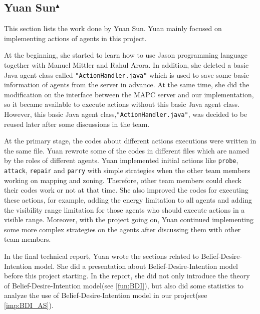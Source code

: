 \subsection[Yuan Sun]{Yuan Sun$^{\blacktriangle}$}
This section lists the work done by Yuan Sun.
Yuan mainly focused on implementing actions of agents in this project. 

At the beginning, she started to learn how to use Jason programming language together with Manuel Mittler and Rahul Arora. In addition, she deleted a basic Java agent class called \texttt{"ActionHandler.java"} which is used to save some basic information of agents from the server in advance. At the same time, she did the modification on the interface between the MAPC server and our implementation, so it became available to execute actions without this basic Java agent class. However, this basic Java agent class,\texttt{"ActionHandler.java"}, was decided to be reused later after some discussions in the team.

At the primary stage, the codes about different actions executions were written in the same file. Yuan rewrote some of the codes in different files which are named by the roles of different agents. Yuan implemented initial actions like \texttt{probe}, \texttt{attack}, \texttt{repair} and \texttt{parry} with simple strategies when the other team members working on mapping and zoning. Therefore, other team members could check their codes work or not at that time. She also improved the codes for executing these actions, for example, adding the energy limitation to all agents and adding the visibility range limitation for those agents who should execute actions in a visible range. Moreover, with the project going on, Yuan continued implementing some more complex strategies on the agents after discussing them with other team members.

In the final technical report, Yuan wrote the sections related to Belief-Desire-Intention model. She did a presentation about Belief-Desire-Intention model before this project starting. In the report, she did not only introduce the theory of Belief-Desire-Intention model(see \autoref{fun:BDI}), but also did some statistics to analyze the use of Belief-Desire-Intention model in our project(see \autoref{imp:BDI_AS}).